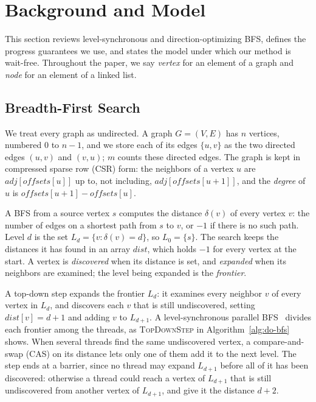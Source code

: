 \section{Background and Model}
\label{sec:background}

This section reviews level-synchronous and direction-optimizing BFS, defines the progress guarantees we use, and states the model under which our method is wait-free. Throughout the paper, we say \emph{vertex} for an element of a graph and \emph{node} for an element of a linked list.

\subsection{Breadth-First Search}
\label{sec:bg-bfs}

We treat every graph as undirected. A graph $G = (V, E)$ has $n$ vertices, numbered $0$ to $n-1$, and we store each of its edges $\{u, v\}$ as the two directed edges $(u, v)$ and $(v, u)$; $m$ counts these directed edges. The graph is kept in compressed sparse row (CSR) form: the neighbors of a vertex $u$ are $\mathit{adj}[\mathit{offsets}[u]]$ up to, not including, $\mathit{adj}[\mathit{offsets}[u+1]]$, and the \emph{degree} of $u$ is $\mathit{offsets}[u+1] - \mathit{offsets}[u]$.

A BFS from a source vertex $s$ computes the distance $\delta(v)$ of every vertex $v$: the number of edges on a shortest path from $s$ to $v$, or $-1$ if there is no such path. Level $d$ is the set $L_d = \{v : \delta(v) = d\}$, so $L_0 = \{s\}$. The search keeps the distances it has found in an array $\mathit{dist}$, which holds $-1$ for every vertex at the start. A vertex is \emph{discovered} when its distance is set, and \emph{expanded} when its neighbors are examined; the level being expanded is the \emph{frontier}.

A top-down step expands the frontier $L_d$: it examines every neighbor $v$ of every vertex in $L_d$, and discovers each $v$ that is still undiscovered, setting $\mathit{dist}[v] = d+1$ and adding $v$ to $L_{d+1}$. A level-synchronous parallel BFS~\cite{bader_bfs, charles_bfs} divides each frontier among the threads, as \textsc{TopDownStep} in Algorithm~\ref{alg:do-bfs} shows. When several threads find the same undiscovered vertex, a compare-and-swap (CAS) on its distance lets only one of them add it to the next level. The step ends at a barrier, since no thread may expand $L_{d+1}$ before all of it has been discovered: otherwise a thread could reach a vertex of $L_{d+1}$ that is still undiscovered from another vertex of $L_{d+1}$, and give it the distance $d+2$.

